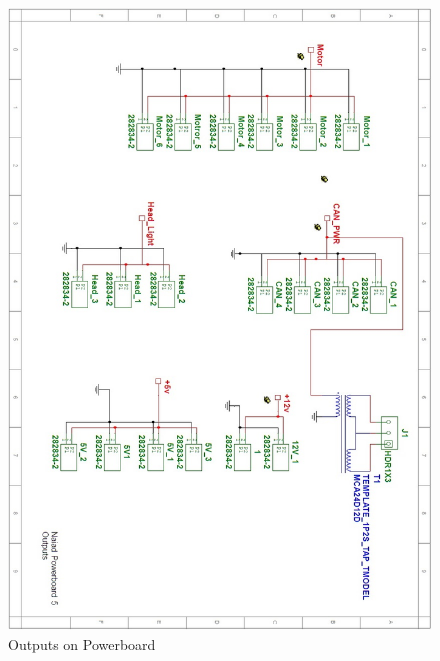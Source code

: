 \begin{figure}[!ht]
	\begin{center}
		\includegraphics[width=13.2cm]{./Images/Powerboard_Scematics/Outputs.jpg}
		\caption{Outputs on Powerboard}
	\end{center}
\end{figure}


